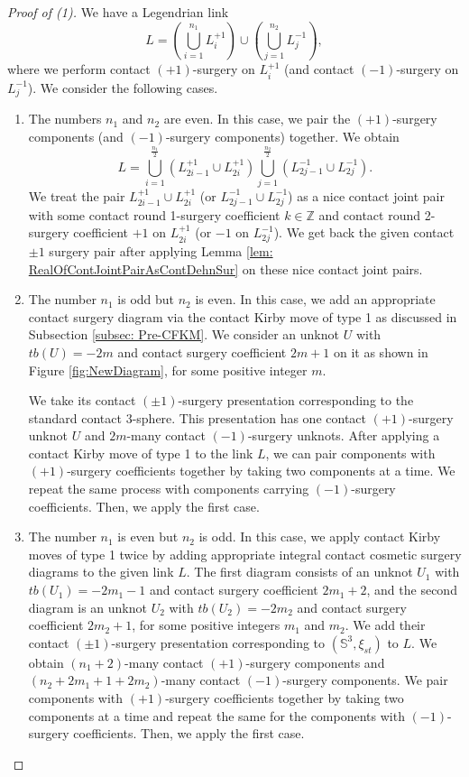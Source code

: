 \documentclass{amsart}
\theoremstyle{plain}
\theoremstyle{remark}
\theoremstyle{definition}
\newcommand{\s}{\mathbb{S}}
\begin{document}
\begin{proof}[Proof of (1)]We have a Legendrian link $$L= \left(\bigcup_{i=1}^{n_1}L_{i}^{+1}\right)\cup \left(\bigcup_{j=1}^{n_2}L_{j}^{-1}\right),$$ where we perform contact $(+1)$-surgery on $L_{i}^{+1}$ (and contact $(-1)$-surgery on $L_{j}^{-1}$). 
    We consider the following cases. 
    \begin{enumerate}
        \item The numbers $n_1$ and $n_2$ are even.
        In this case, we pair the $(+1)$-surgery components (and $(-1)$-surgery components) together. 
        We obtain $$L= \bigcup_{i=1}^{\frac{n_1}{2}} (L_{2i-1}^{+1}\cup L_{2i}^{+1}) \bigcup_{j=1}^{\frac{n_2}{2}}(L_{2j-1}^{-1}\cup L_{2j}^{-1}).$$
        We treat the pair $L_{2i-1}^{+1}\cup L_{2i}^{+1}$ (or $L_{2j-1}^{-1}\cup L_{2j}^{-1}$)  as a nice contact joint pair with some contact round 1-surgery coefficient $k\in \mathbb{Z}$ and contact round 2-surgery coefficient $+1$ on $L_{2i}^{+1}$ (or $-1$ on $L_{2j}^{-1}$). 
        We get back the given contact $\pm1$ surgery pair after applying Lemma \ref{lem: RealOfContJointPairAsContDehnSur} on these nice contact joint pairs.

        \item The number $n_1$ is odd but $n_2$ is even. 
        In this case, we add an appropriate contact surgery diagram via the contact Kirby move of type 1 as discussed in Subsection \ref{subsec: Pre-CFKM}. 
        We consider an unknot $U$ with $tb(U)=-2m$ and contact surgery coefficient $2m+1$ on it as shown in Figure \ref{fig:NewDiagram}, for some positive integer $m$.

       We take its contact $(\pm1)$-surgery presentation corresponding to the standard contact 3-sphere. 
        This presentation has one contact $(+1)$-surgery unknot $U$ and $2m$-many contact $(-1)$-surgery unknots. 
        After applying a contact Kirby move of type 1 to the link $L$, we can pair components with $(+1)$-surgery coefficients together by taking two components at a time. 
        We repeat the same process with components carrying $(-1)$-surgery coefficients. Then, we apply the first case.

        \item The number $n_1$ is even but $n_2$ is odd. 
        In this case, we apply contact Kirby moves of type 1 twice by adding appropriate integral contact cosmetic surgery diagrams to the given link $L$. 
        The first diagram consists of an unknot $U_1$ with $tb(U_1)=-2m_1-1$ and contact surgery coefficient $2m_1+2$, and the second diagram is an unknot $U_2$ with $tb(U_2)=-2m_2$ and contact surgery coefficient $2m_2+1$, for some positive integers $m_1$ and $m_2$.
        We add their contact $(\pm1)$-surgery presentation corresponding to $\left(\s^3, \xi_{st}\right)$ to $L$. 
        We obtain $(n_1+ 2)$-many contact $(+1)$-surgery components and  $(n_2+ 2m_1+1 + 2m_2)$-many contact $(-1)$-surgery components.
        We pair components with $(+1)$-surgery coefficients together by taking two components at a time and repeat the same for the components with $(-1)$-surgery coefficients. 
        Then, we apply the first case.


\end{enumerate}
\end{proof}
\end{document}
